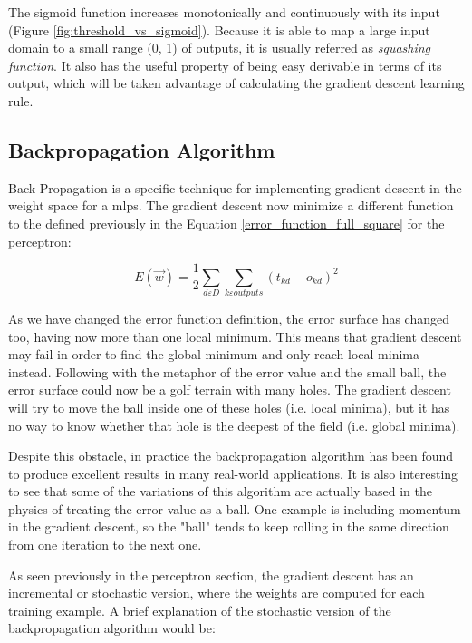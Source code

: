 	The sigmoid function increases monotonically and continuously with its input (Figure \ref{fig:threshold_vs_sigmoid}). Because it is able to map a large input domain to a small range (0, 1) of outputs, it is usually referred as \textit{squashing function}. It also has the useful property of being easy derivable in terms of its output, which will be taken advantage of calculating the gradient descent learning rule.

	\subsection{Backpropagation Algorithm}
	Back Propagation is a specific technique for implementing gradient descent in the weight space for a \glspl{mlp}. The gradient descent now minimize a different function to the defined previously in the Equation \ref{error_function_full_square} for the perceptron: 

		\begin{equation}
			\label{squared_error_function_network}
			E(\vec{w}) = \frac{1}{2} \sum_{d \varepsilon D} \sum_{k \varepsilon outputs} (t_{kd}-o_{kd})^2 
		\end{equation}

	As we have changed the error function definition, the error surface has changed too, having now more than one local minimum. This means that gradient descent may fail in order to find the global minimum and only reach local minima instead. Following with the metaphor of the error value and the small ball, the error surface could now be a golf terrain with many holes. The gradient descent will try to move the ball inside one of these holes (i.e. local minima), but it has no way to know whether that hole is the deepest of the field (i.e. global minima).

	\clearpage 

	Despite this obstacle, in practice the backpropagation algorithm has been found to produce excellent results in many real-world applications. It is also interesting to see that some of the variations of this algorithm are actually based in the physics of treating the error value as a ball. One example is including momentum in the gradient descent, so the "ball" tends to keep rolling in the same direction from one iteration to the next one.

	As seen previously in the perceptron section, the gradient descent has an incremental or stochastic version, where the weights are computed for each training example. A brief explanation of the stochastic version of the backpropagation algorithm would be:

